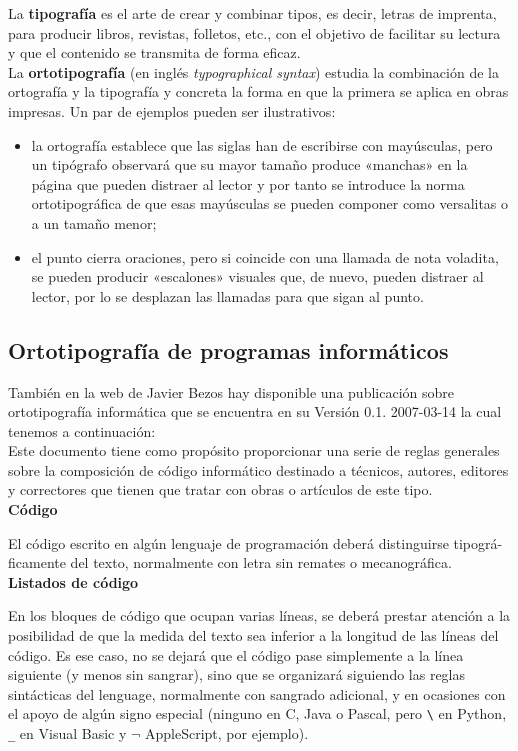 La \textbf{tipografía} es el arte de crear y combinar tipos, es decir, letras de imprenta, para producir libros, revistas, folletos, etc., con el objetivo de facilitar su lectura y que el contenido se transmita de forma eficaz.\\

La \textbf{ortotipografía} (en inglés \textit{typographical syntax}) estudia la combinación de la ortografía y la tipografía y concreta la forma en que la primera se aplica en obras impresas. Un par de ejemplos pueden ser ilustrativos: \\
\begin{itemize}
\item la ortografía establece que las siglas han de escribirse con mayúsculas, pero un tipógrafo observará que su mayor tamaño produce «manchas» en la página que pueden distraer al lector y por tanto se introduce la norma ortotipográfica de que esas mayúsculas se pueden componer como versalitas o a un tamaño menor;
\item  el punto cierra oraciones, pero si coincide con una llamada de nota voladita, se pueden producir «escalones» visuales que, de nuevo, pueden distraer al lector, por lo se desplazan las llamadas para que sigan al punto.
\end{itemize}

\subsection{Ortotipografía de programas informáticos}
También en la web de Javier Bezos hay disponible una publicación sobre ortotipografía informática que se encuentra en su Versión 0.1. 2007-03-14 la cual tenemos a continuación:\\

  Este documento tiene como propósito proporcionar una serie de reglas generales
sobre la composición de código informático destinado a técnicos, autores, editores
y correctores que tienen que tratar con obras o artículos de este tipo.\\

\noindent\textbf{Código}

  El código escrito en algún lenguaje de programación deberá distinguirse tipográ-
ficamente del texto, normalmente con letra sin remates o mecanográfica.\\

\noindent\textbf{Listados de código}

  En los bloques de código que ocupan varias líneas, se deberá prestar atención a
la posibilidad de que la medida del texto sea inferior a la longitud de las líneas del
código. Es ese caso, no se dejará que el código pase simplemente a la línea siguiente
(y menos sin sangrar), sino que se organizará siguiendo las reglas sintácticas del
lenguage, normalmente con sangrado adicional, y en ocasiones con el apoyo de
algún signo especial (ninguno en C, Java o Pascal, pero \verb|\| en Python, \verb|_| en Visual
Basic y $\neg$ AppleScript, por ejemplo).\\

